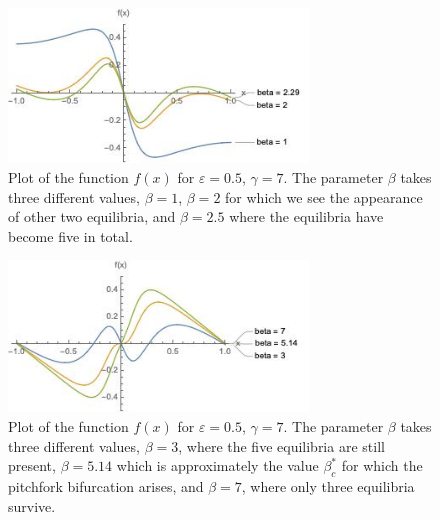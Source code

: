 \documentclass[a4paper,10pt,leqno]{amsart}
\theoremstyle{plain}
\begin{document}
\begin{figure}   
\centering   
\includegraphics[width=8cm]{grafico_f_over1.jpg}   
\caption{Plot of the function $f(x)$ for $\varepsilon = 0.5$, $\gamma =7$. The parameter $\beta$ takes three different values, $\beta = 1$, $\beta = 2$ for which we see the appearance of other two equilibria, and $\beta = 2.5$ where the equilibria have become five in total.}   
\label{grafico_f_super1}   
\end{figure}   



\begin{figure}   
\centering   
\includegraphics[width=8cm]{grafico_f_over2.jpg}   
\caption{Plot of the function $f(x)$ for $\varepsilon = 0.5$, $\gamma =7$. The parameter $\beta$ takes three different values, $\beta = 3$, where the five equilibria are still present, $\beta = 5.14$ which is approximately the value $\beta^*_c$ for which the pitchfork bifurcation arises, and $\beta = 7$, where only three equilibria survive.}   
\label{grafico_f_super2}   
\end{figure}   
\end{document}
